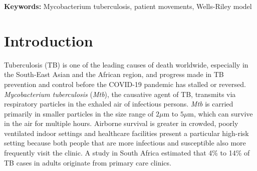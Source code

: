 \documentclass[fleqn,11pt]{wlscirep}
\begin{document}

\flushbottom
\maketitle
\setcounter{page}{1}
\thispagestyle{fancy}

\vspace{2em}


\vspace{0.5em}

\noindent\textbf{Keywords:} Mycobacterium tuberculosis, patient movements, Wells-Riley model
\newpage

\sloppy
\raggedbottom

\newpage

\section{Introduction} 

Tuberculosis (TB) is one of the leading causes of death worldwide, especially in the South-East Asian and the African region, and progress made in TB prevention and control before the COVID-19 pandemic has stalled or reversed\cite{WHO2022TBReport}. \emph{Mycobacterium tuberculosis} (\emph{Mtb}), the causative agent of TB, transmits via respiratory particles in the exhaled air of infectious persons\cite{Rieder1999,Patterson2021Tuberculosis}. \emph{Mtb} is carried primarily in smaller particles in the size range of $2\mu$m to $5\mu$m\cite{Fennelly2020Lancet}, which can survive in the air for multiple hours\cite{Loudon1969AMRRD}. Airborne survival is greater in crowded, poorly ventilated indoor settings\cite{Rieder1999,CPS2013Book,Nardell1991ARRD,Wang2021Science,Morawska2021} and healthcare facilities present a particular high-risk setting because both people that are more infectious and susceptible also more frequently visit the clinic\cite{McCreesh2020IJTLD}. A study in South Africa estimated that 4\% to 14\% of TB cases in adults originate from primary care clinics\cite{McCreesh2022BMJGlobalHealth}.
\end{document}
